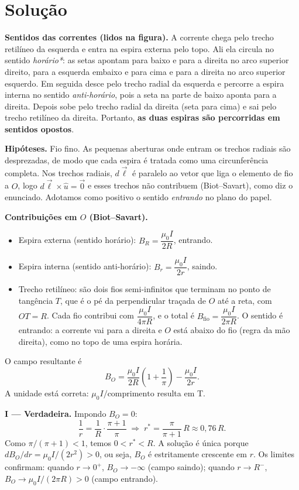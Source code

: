 \documentclass{article}%
\begin{document}
\section*{Solução}

\textbf{Sentidos das correntes (lidos na figura).} A corrente chega pelo trecho retilíneo da esquerda e entra na espira externa pelo topo. Ali ela circula no sentido \emph{horário*}: as setas apontam para baixo e para a direita no arco superior direito, para a esquerda embaixo e para cima e para a direita no arco superior esquerdo. Em seguida desce pelo trecho radial da esquerda e percorre a espira interna no sentido \emph{anti-horário}, pois a seta na parte de baixo aponta para a direita. Depois sobe pelo trecho radial da direita (seta para cima) e sai pelo trecho retilíneo da direita. Portanto, \textbf{as duas espiras são percorridas em sentidos opostos}.

\textbf{Hipóteses.} Fio fino. As pequenas aberturas onde entram os trechos radiais são desprezadas, de modo que cada espira é tratada como uma circunferência completa. Nos trechos radiais, $d\vec{\ell}$ é paralelo ao vetor que liga o elemento de fio a $O$, logo $d\vec{\ell}\times\hat{u}=\vec 0$ e esses trechos não contribuem (Biot--Savart), como diz o enunciado. Adotamos como positivo o sentido \emph{entrando} no plano do papel.

\textbf{Contribuições em $O$ (Biot--Savart).}
\begin{itemize}
\item Espira externa (sentido horário): $B_R=\dfrac{\mu_0 I}{2R}$, entrando.
\item Espira interna (sentido anti-horário): $B_r=\dfrac{\mu_0 I}{2r}$, saindo.
\item Trecho retilíneo: são dois fios semi-infinitos que terminam no ponto de tangência $T$, que é o pé da perpendicular traçada de $O$ até a reta, com $OT=R$. Cada fio contribui com $\dfrac{\mu_0 I}{4\pi R}$, e o total é $B_{\text{fio}}=\dfrac{\mu_0 I}{2\pi R}$. O sentido é entrando: a corrente vai para a direita e $O$ está abaixo do fio (regra da mão direita), como no topo de uma espira horária.
\end{itemize}
O campo resultante é
\[
B_O=\frac{\mu_0 I}{2R}\left(1+\frac{1}{\pi}\right)-\frac{\mu_0 I}{2r}.
\]
A unidade está correta: $\mu_0 I/\text{comprimento}$ resulta em T.

\textbf{I --- Verdadeira.} Impondo $B_O=0$:
\[
\frac{1}{r}=\frac{1}{R}\cdot\frac{\pi+1}{\pi}\;\Longrightarrow\; r^{*}=\frac{\pi}{\pi+1}\,R\approx 0{,}76\,R .
\]
Como $\pi/(\pi+1)<1$, temos $0<r^{*}<R$. A solução é única porque $dB_O/dr=\mu_0 I/(2r^2)>0$, ou seja, $B_O$ é estritamente crescente em $r$. Os limites confirmam: quando $r\to 0^+$, $B_O\to-\infty$ (campo saindo); quando $r\to R^-$, $B_O\to \mu_0 I/(2\pi R)>0$ (campo entrando).
\end{document}
